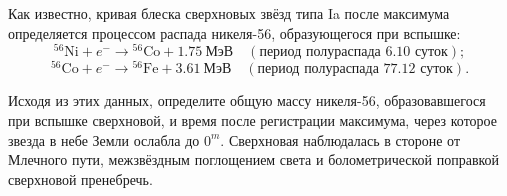 \documentclass[12pt]{article}
\begin{document}
Как известно, кривая блеска сверхновых звёзд типа Ia после максимума определяется
процессом распада никеля-56, образующегося при вспышке:
\[
{}^{56}\mathrm{Ni} + e^- \rightarrow {}^{56}\mathrm{Co} + 1.75~\text{МэВ}
\quad (\text{период полураспада } 6.10 \text{ суток});
\]
\[
{}^{56}\mathrm{Co} + e^- \rightarrow {}^{56}\mathrm{Fe} + 3.61~\text{МэВ}
\quad (\text{период полураспада } 77.12 \text{ суток}).
\]

Исходя из этих данных, определите общую массу никеля-56, образовавшегося при вспышке
сверхновой, и время после регистрации максимума, через которое звезда в небе Земли
ослабла до $0^m$. Сверхновая наблюдалась в стороне от Млечного пути, межзвёздным
поглощением света и болометрической поправкой сверхновой пренебречь.
\end{document}
